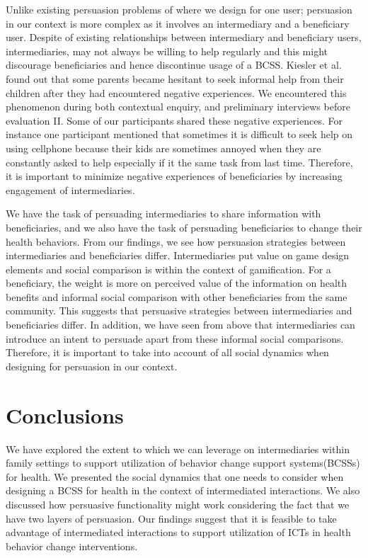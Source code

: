 \documentclass{sig-alternate}
\begin{document}
Unlike existing persuasion problems of where we design for one user;
persuasion in our context is more complex as it involves an intermediary and a
beneficiary user. Despite of existing relationships between intermediary and
beneficiary users, intermediaries, may not always be willing to help regularly
and this might discourage beneficiaries and hence discontinue usage of a BCSS.
Kiesler et al.\cite{kiesler:twi} found out that some parents became hesitant
to seek informal help from their children after they had encountered negative
experiences. We encountered this phenomenon during both contextual enquiry,
and preliminary interviews before evaluation II. Some of our participants
shared these negative experiences. For instance one participant mentioned that
sometimes it is difficult to seek help on using cellphone because their kids
are sometimes annoyed when they are constantly asked to help especially if it
the same task from last time. Therefore, it is important to minimize negative
experiences of beneficiaries by increasing engagement of intermediaries.

We have the task of persuading intermediaries to share information with
beneficiaries, and we also have the task of persuading beneficiaries to change
their health behaviors. From our findings, we see how persuasion strategies
between intermediaries and beneficiaries differ. Intermediaries put value on
game design elements and social comparison is within the context of
gamification. For a beneficiary, the weight is more on perceived value of the
information on health benefits and informal social comparison with other
beneficiaries from the same community. This suggests that persuasive
strategies between intermediaries and beneficiaries differ. In addition, we
have seen from above that intermediaries can introduce an intent to persuade
apart from these informal social comparisons. Therefore, it is important to
take into account of all social dynamics when designing for persuasion in our
context.

\section{Conclusions}

We have explored the extent to which we can leverage on intermediaries within
family settings to support utilization of behavior change support
systems(BCSSs) for health. We presented the social dynamics that one needs to
consider when designing a BCSS for health in the context of intermediated
interactions. We also discussed how persuasive functionality might work
considering the fact that we have two layers of persuasion. Our findings
suggest that it is feasible to take advantage of intermediated interactions to
support utilization of ICTs in health behavior change interventions.
   
\end{document}
